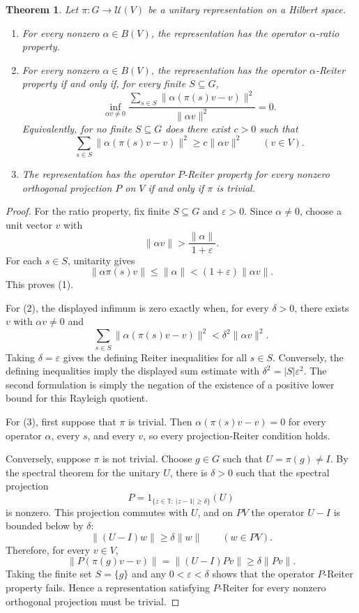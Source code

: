 \documentclass[11pt]{article}
\newtheorem{theorem}{Theorem}
\newcommand{\eps}{\varepsilon}
\begin{document}
\begin{theorem}
\label{thm:main}
Let $\pi:G\to \mathcal U(V)$ be a unitary representation on a Hilbert space.

\begin{enumerate}
\item For every nonzero $\alpha\in B(V)$, the representation has the operator
$\alpha$-ratio property.

\item For every nonzero $\alpha\in B(V)$, the representation has the operator
$\alpha$-Reiter property if and only if, for every finite $S\subseteq G$,
\[
  \inf_{\alpha v\neq 0}
  \frac{\sum_{s\in S}\|\alpha(\pi(s)v-v)\|^2}{\|\alpha v\|^2}=0.
\]
Equivalently, for no finite $S\subseteq G$ does there exist $c>0$ such that
\[
  \sum_{s\in S}\|\alpha(\pi(s)v-v)\|^2
  \geq c\|\alpha v\|^2
  \qquad(v\in V).
\]

\item The representation has the operator $P$-Reiter property for every
nonzero orthogonal projection $P$ on $V$ if and only if $\pi$ is trivial.
\end{enumerate}
\end{theorem}

\begin{proof}
For the ratio property, fix finite $S\subseteq G$ and $\eps>0$.  Since
$\alpha\neq0$, choose a unit vector $v$ with
\[
  \|\alpha v\|>\frac{\|\alpha\|}{1+\eps}.
\]
For each $s\in S$, unitarity gives
\[
  \|\alpha\pi(s)v\|\leq \|\alpha\|<(1+\eps)\|\alpha v\|.
\]
This proves (1).

For (2), the displayed infimum is zero exactly when, for every $\delta>0$,
there exists $v$ with $\alpha v\neq0$ and
\[
  \sum_{s\in S}\|\alpha(\pi(s)v-v)\|^2
  <\delta^2\|\alpha v\|^2.
\]
Taking $\delta=\eps$ gives the defining Reiter inequalities for all
$s\in S$.  Conversely, the defining inequalities imply the displayed sum
estimate with $\delta^2=|S|\eps^2$.  The second formulation is simply the
negation of the existence of a positive lower bound for this Rayleigh
quotient.

For (3), first suppose that $\pi$ is trivial.  Then
$\alpha(\pi(s)v-v)=0$ for every operator $\alpha$, every $s$, and every $v$,
so every projection-Reiter condition holds.

Conversely, suppose $\pi$ is not trivial.  Choose $g\in G$ such that
$U=\pi(g)\neq I$.  By the spectral theorem for the unitary $U$, there is
$\delta>0$ such that the spectral projection
\[
  P=1_{\{z\in\mathbb T:\ |z-1|\geq \delta\}}(U)
\]
is nonzero.  This projection commutes with $U$, and on $PV$ the operator
$U-I$ is bounded below by $\delta$:
\[
  \|(U-I)w\|\geq \delta\|w\|\qquad(w\in PV).
\]
Therefore, for every $v\in V$,
\[
  \|P(\pi(g)v-v)\|
  =\|(U-I)Pv\|
  \geq \delta\|Pv\|.
\]
Taking the finite set $S=\{g\}$ and any $0<\eps<\delta$ shows that the
operator $P$-Reiter property fails.  Hence a representation satisfying
$P$-Reiter for every nonzero orthogonal projection must be trivial.
\end{proof}
\end{document}
